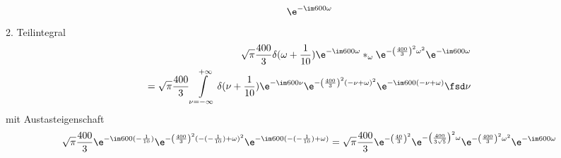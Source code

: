 \begin{ExCalc}
\begin{align}
 \e^{-\im 600 \omega}
\end{align}
%
%
%
2. Teilintegral
\begin{align}
\sqrt{\pi} \frac{400}{3}
\delta(\omega + \frac{1}{10})\e^{-\im 600 \omega}
\ast_\omega
\e^{-\left(\frac{400}{3}\right)^2 \omega^2} \e^{-\im 600 \omega}\nonumber\\
=\sqrt{\pi} \frac{400}{3} \int\limits_{\nu =-\infty}^{+\infty}
\delta(\nu + \frac{1}{10})\e^{-\im 600 \nu}
\e^{-\left(\frac{400}{3}\right)^2 (-\nu+\omega)^2} \e^{-\im 600 (-\nu+\omega)}\fsd \nu
\end{align}
mit Austasteigenschaft
\begin{align}
\sqrt{\pi} \frac{400}{3}
\e^{-\im 600 (-\frac{1}{10})}
\e^{-\left(\frac{400}{3}\right)^2 (-(-\frac{1}{10})+\omega)^2} \e^{-\im 600 (-(-\frac{1}{10})+\omega)}
=
\sqrt{\pi} \frac{400}{3}
\e^{-\left(\frac{40}{3}\right)^2}
\e^{-\left(\frac{400}{3 \sqrt{5}}\right)^2 \omega}
\e^{-\left(\frac{400}{3}\right)^2 \omega^2}
\e^{-\im 600 \omega}
\end{align}


\end{ExCalc}
